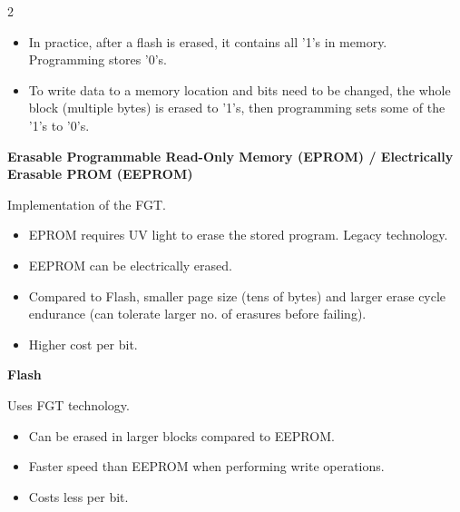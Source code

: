 \documentclass[10pt]{article}
\begin{document}
\begin{multicols}{2}
\begin{itemize}
    \item In practice, after a flash is erased, it contains all '1's in memory. Programming stores '0's.
    \item To write data to a memory location and bits need to be changed, the whole block (multiple bytes) is erased to '1's, then programming sets some of the '1's to '0's.
\end{itemize}
\textbf{Erasable Programmable Read-Only Memory (EPROM) / Electrically Erasable PROM (EEPROM)}\\
{}
Implementation of the FGT.\\
\begin{itemize}
    \item EPROM requires UV light to erase the stored program. Legacy technology.
    \item EEPROM can be electrically erased.
    \item Compared to Flash, smaller page size (tens of bytes) and larger erase cycle endurance (can tolerate larger no. of erasures before failing).
    \item Higher cost per bit.
\end{itemize}
\textbf{Flash}\\
{}
Uses FGT technology.\\
\begin{itemize}
    \item Can be erased in larger blocks compared to EEPROM.
    \item Faster speed than EEPROM when performing write operations.
    \item Costs less per bit.
\end{itemize}


\end{multicols}
\end{document}
